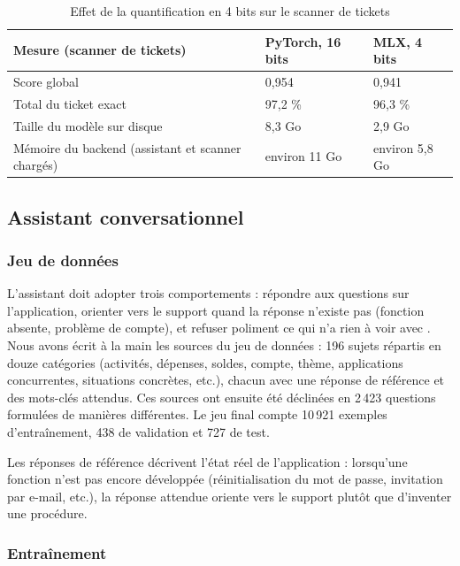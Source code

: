 \begin{table}[H]
\centering
\small
\begin{tabularx}{\textwidth}{|Y|C{3.3cm}|C{3.3cm}|}
\hline
{}\textbf{Mesure (scanner de tickets)} & \textbf{PyTorch, 16 bits} & \textbf{MLX, 4 bits} \\ \hline
Score global & 0,954 & 0,941 \\ \hline
Total du ticket exact & 97,2 \% & 96,3 \% \\ \hline
Taille du modèle sur disque & 8,3 Go & 2,9 Go \\ \hline
Mémoire du backend (assistant et scanner chargés) & environ 11 Go & environ 5,8 Go \\ \hline
\end{tabularx}
\caption{Effet de la quantification en 4 bits sur le scanner de tickets}
\label{tab:quantification}
\end{table}

\subsection{Assistant conversationnel}

\subsubsection{Jeu de données}

L'assistant doit adopter trois comportements : répondre aux questions sur l'application,
orienter vers le support quand la réponse n'existe pas (fonction absente, problème de
compte), et refuser poliment ce qui n'a rien à voir avec \equipay. Nous avons écrit à la main
les sources du jeu de données : 196 sujets répartis en douze catégories (activités,
dépenses, soldes, compte, thème, applications concurrentes, situations concrètes, etc.),
chacun avec une réponse de référence et des mots-clés attendus. Ces sources ont ensuite été
déclinées en 2\,423 questions formulées de manières différentes. Le jeu final compte
10\,921 exemples d'entraînement, 438 de validation et 727 de test.

Les réponses de référence décrivent l'état réel de l'application : lorsqu'une fonction n'est
pas encore développée (réinitialisation du mot de passe, invitation par e-mail, etc.), la
réponse attendue oriente vers le support plutôt que d'inventer une procédure.

\subsubsection{Entraînement}

